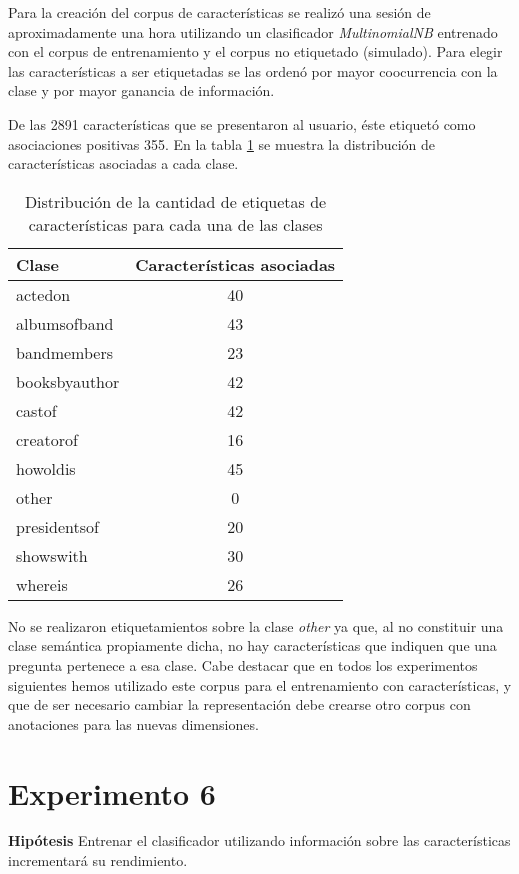 Para la creación del corpus de características se realizó una sesión de aproximadamente una hora utilizando un clasificador \textit{MultinomialNB} entrenado con el corpus de entrenamiento y el corpus no etiquetado (simulado). Para elegir las características a ser etiquetadas se las ordenó por mayor coocurrencia con la clase y por mayor ganancia de información.

De las 2891 características que se presentaron al usuario, éste etiquetó como asociaciones positivas 355. En la tabla \ref{dist-feat-corpus} se muestra la distribución de características asociadas a cada clase.

\begin{table}[h]
\centering
\begin{tabular}{l c}
    Clase & Características asociadas\\ [0.5ex]
    \hline
    actedon & 40 \\ [0.5ex]
    albumsofband & 43 \\ [0.5ex]
    bandmembers &  23 \\ [0.5ex]
    booksbyauthor &  42 \\ [0.5ex]
    castof & 42 \\ [0.5ex]
    creatorof & 16 \\ [0.5ex]
    howoldis & 45 \\ [0.5ex]
    other & 0 \\ [0.5ex]
    presidentsof & 20 \\ [0.5ex]
    showswith & 30 \\ [0.5ex]
    whereis & 26 \\ [0.5ex]
    \hline
\end{tabular}
\caption{Distribución de la cantidad de etiquetas de características para cada una de las clases}\label{dist-feat-corpus}
\end{table}

No se realizaron etiquetamientos sobre la clase \textit{other} ya que, al no constituir una clase semántica propiamente dicha, no hay características que indiquen que una pregunta pertenece a esa clase. Cabe destacar que en todos los experimentos siguientes hemos utilizado este corpus para el entrenamiento con características, y que de ser necesario cambiar la representación debe crearse otro corpus con anotaciones para las nuevas dimensiones.

\section{Experimento 6}
\vspace{3 mm}
\textbf{Hipótesis} Entrenar el clasificador utilizando información sobre las características incrementará su rendimiento.
\vspace{3 mm}

